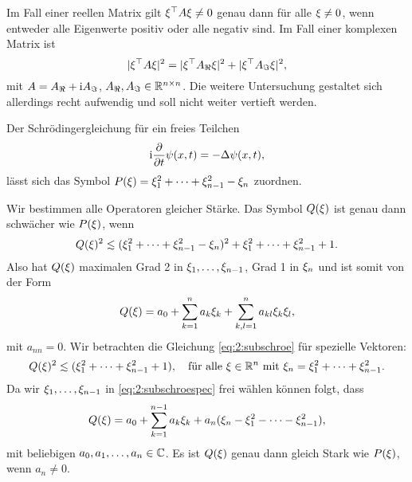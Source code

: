 \begin{exa}
Im Fall einer reellen Matrix gilt $\xi^\top A\xi\neq0$ genau dann für alle $\xi\neq0$,
wenn entweder alle Eigenwerte positiv oder alle negativ sind.
Im Fall einer komplexen Matrix ist
\begin{equation}
\lvert\xi^\top A\xi\rvert^2=\lvert\xi^\top A_\Re\xi\rvert^2+\lvert\xi^\top A_\Im\xi\rvert^2,
\end{equation}
mit $A=A_\Re+\mathrm i A_\Im$, $A_\Re,A_\Im\in\mathbb R^{n\times n}$.
Die weitere Untersuchung gestaltet sich allerdings recht aufwendig
und soll nicht weiter vertieft werden.
\end{exa}

\begin{exa}\label{exa:2:schroe}
Der Schrödingergleichung für ein freies Teilchen
\begin{equation}
\mathrm i\frac{\partial}{\partial t}\psi(x,t)=-\Delta\psi(x,t),\end{equation}
lässt sich das Symbol $P(\xi)=\xi^2_1+\dots+\xi^2_{n-1}-\xi_n$ zuordnen.

Wir bestimmen alle Operatoren gleicher Stärke.
Das Symbol $Q(\xi)$ ist genau dann schwächer wie $P(\xi)$,
wenn
\begin{equation}\label{eq:2:subschroe}
Q(\x)^2\apprle(\x^2_1+\dots+\x^2_{n-1}-\x_n)^2+\x^2_1+\dots+\x^2_{n-1}+1.
\end{equation}
Also hat $Q(\xi)$ maximalen Grad 2 in $\xi_1,\dots,\xi_{n-1}$,
Grad 1 in $\xi_n$ und ist somit von der Form
\begin{equation}
Q(\xi)=a_0+\sum^n_{k=1}a_k\xi_k+\sum^n_{k,l=1}a_{kl}\xi_k\xi_l,
\end{equation}
mit $a_{nn}=0$.
Wir betrachten die Gleichung \eqref{eq:2:subschroe}
für spezielle Vektoren:
\begin{equation}\label{eq:2:subschroespec}
Q(\x)^2\apprle(\x^2_1+\dots+\x^2_{n-1}+1),
\quad\text{für alle}~\x\in\R^n~\text{mit}~\x_n=\x^2_1+\dots+\x^2_{n-1}.
\end{equation}
Da wir $\xi_1,\dots,\xi_{n-1}$ in \eqref{eq:2:subschroespec} frei wählen können folgt, dass
\begin{equation}
Q(\xi)=a_0+\sum_{k=1}^{n-1}a_k\xi_k+a_n(\xi_n-\xi^2_1-\dots-\xi^2_{n-1}),
\end{equation}
mit beliebigen $a_0,a_1,\dots,a_n\in\mathbb C$.
Es ist $Q(\xi)$ genau dann gleich Stark wie $P(\xi)$,
wenn $a_n\neq0$.
\end{exa}

